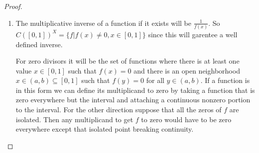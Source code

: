\documentclass[10pt]{article}
\theoremstyle{plain}
\theoremstyle{remark}
\begin{document}
\begin{proof}
  \begin{enumerate}
  \item The multiplicative inverse of a function if it exists will be
    $\frac{1}{f(x)}$. So $C([0,1])^X=\{f|f(x)\neq 0,x\in[0,1]\}$ since this will
    garentee a well defined inverse.

    For zero divisors it will be the set of functions where there is at least
    one value $x\in[0,1]$ such that $f(x)=0$ and there is an open neighborhood
    $x\in(a,b)\subseteq[0,1]$ such that $f(y)=0$ for all $y\in(a,b)$. If a function is
    in this form we can define its multiplicand to zero by taking a function
    that is zero everywhere but the interval and attaching a continuous
    nonzero portion to the interval. For the other direction suppose that
    all the zeros of $f$ are isolated. Then any multiplicand to get $f$ to
    zero would have to be zero everywhere except that isolated point breaking
    continuity.


\end{enumerate}
\end{proof}
\end{document}
